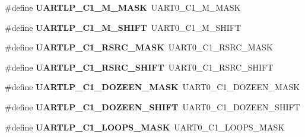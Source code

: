 \begin{DoxyCompactItemize}
\item 
\mbox{\label{group___backward___compatibility___symbols_gaf7b253cfe0dae018953b5a5f7e696beb}} 
\#define {\bfseries U\+A\+R\+T\+L\+P\+\_\+\+C1\+\_\+\+M\+\_\+\+M\+A\+SK}~U\+A\+R\+T0\+\_\+\+C1\+\_\+\+M\+\_\+\+M\+A\+SK
\item 
\mbox{\label{group___backward___compatibility___symbols_ga7f948b34e2c66421e265c5d499e87db6}} 
\#define {\bfseries U\+A\+R\+T\+L\+P\+\_\+\+C1\+\_\+\+M\+\_\+\+S\+H\+I\+FT}~U\+A\+R\+T0\+\_\+\+C1\+\_\+\+M\+\_\+\+S\+H\+I\+FT
\item 
\mbox{\label{group___backward___compatibility___symbols_gaa53951441e58bf423d327892a23aa074}} 
\#define {\bfseries U\+A\+R\+T\+L\+P\+\_\+\+C1\+\_\+\+R\+S\+R\+C\+\_\+\+M\+A\+SK}~U\+A\+R\+T0\+\_\+\+C1\+\_\+\+R\+S\+R\+C\+\_\+\+M\+A\+SK
\item 
\mbox{\label{group___backward___compatibility___symbols_ga4edf9821b67824b0fdd4931c27ce452d}} 
\#define {\bfseries U\+A\+R\+T\+L\+P\+\_\+\+C1\+\_\+\+R\+S\+R\+C\+\_\+\+S\+H\+I\+FT}~U\+A\+R\+T0\+\_\+\+C1\+\_\+\+R\+S\+R\+C\+\_\+\+S\+H\+I\+FT
\item 
\mbox{\label{group___backward___compatibility___symbols_gaa700bb55bfafb472644d0616a9488c97}} 
\#define {\bfseries U\+A\+R\+T\+L\+P\+\_\+\+C1\+\_\+\+D\+O\+Z\+E\+E\+N\+\_\+\+M\+A\+SK}~U\+A\+R\+T0\+\_\+\+C1\+\_\+\+D\+O\+Z\+E\+E\+N\+\_\+\+M\+A\+SK
\item 
\mbox{\label{group___backward___compatibility___symbols_ga643a9b2d4426aa5f6cd371cf81b95404}} 
\#define {\bfseries U\+A\+R\+T\+L\+P\+\_\+\+C1\+\_\+\+D\+O\+Z\+E\+E\+N\+\_\+\+S\+H\+I\+FT}~U\+A\+R\+T0\+\_\+\+C1\+\_\+\+D\+O\+Z\+E\+E\+N\+\_\+\+S\+H\+I\+FT
\item 
\mbox{\label{group___backward___compatibility___symbols_gabf6750c9bbd5add41b650fcb0e2f3cc9}} 
\#define {\bfseries U\+A\+R\+T\+L\+P\+\_\+\+C1\+\_\+\+L\+O\+O\+P\+S\+\_\+\+M\+A\+SK}~U\+A\+R\+T0\+\_\+\+C1\+\_\+\+L\+O\+O\+P\+S\+\_\+\+M\+A\+SK

\end{DoxyCompactItemize}
